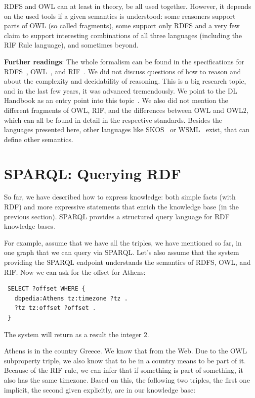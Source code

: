 RDFS and OWL can at least in theory, be all used together.
However, it depends on the used tools if a given semantics is understood: some reasoners support parts of OWL (so called fragments), some support only RDFS and a very few claim to support interesting combinations of all three languages (including the RIF Rule language), and sometimes beyond.

\medskip

\textbf{Further readings}:
The whole formalism can be found in the specifications for RDFS~\cite{rdfs}, OWL~\cite{owl}, and RIF~\cite{rif}.
We did not discuss questions of how to reason and about the complexity and decidability of reasoning. 
This is a big research topic, and in the last few years, it was advanced tremendously. 
We point to the DL Handbook as an entry point into this topic~\cite{dl-handbook}.
We also did not mention the different fragments of OWL, RIF, and the differences between OWL and OWL2, which can all be found in detail in the respective standards.
Besides the languages presented here, other languages like SKOS~\cite{skos} or WSML~\cite{wsml} exist, that can define other semantics.

\section{SPARQL: Querying RDF}
\label{sparql}

So far, we have described how to express knowledge: both simple facts (with RDF) and more expressive statements that enrich the knowledge base (in the previous section).
SPARQL provides a structured query language for RDF knowledge bases.

For example, assume that we have all the triples, we have mentioned so far, in one graph that we can query via SPARQL.
Let's also assume that the system providing the SPARQL endpoint understands the semantics of RDFS, OWL, and RIF.
Now we can ask for the offset for Athens:

\begin{verbatim}
 SELECT ?offset WHERE {
   dbpedia:Athens tz:timezone ?tz .
   ?tz tz:offset ?offset .
 }
\end{verbatim}

The system will return as a result the integer $2$.

Athens is in the country Greece. We know that from the Web.
Due to the OWL subproperty triple, we also know that to be in a country means to be part of it.
Because of the RIF rule, we can infer that if something is part of something, it also has the same timezone.
Based on this, the following two triples, the first one implicit, the second given explicitly, are in our knowledge base:


